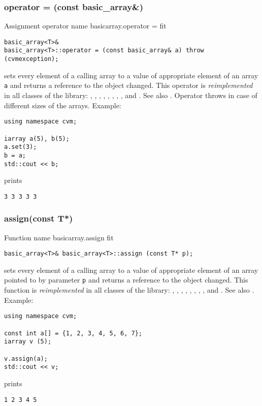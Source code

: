 \subsubsection{operator = (const basic\_array\&)}
Assignment operator%
\pdfdest name {basicarray.operator =} fit
\begin{verbatim}
basic_array<T>&
basic_array<T>::operator = (const basic_array& a) throw (cvmexception);
\end{verbatim}
sets every element of a calling array to a value of
appropriate element of an array  \verb"a"
and returns a reference to the object changed.
This operator is \emph{reimplemented} in all classes of the library:
,  ,
,   ,
, ,
, ,
 and .
See also .
Operator throws 
in case of different sizes of the arrays.
Example:
\begin{Verbatim}
using namespace cvm;

iarray a(5), b(5);
a.set(3);
b = a;
std::cout << b;
\end{Verbatim}
prints
\begin{Verbatim}
3 3 3 3 3
\end{Verbatim}
\newpage


\subsubsection{assign(const T*)}
Function%
\pdfdest name {basicarray.assign} fit
\begin{verbatim}
basic_array<T>& basic_array<T>::assign (const T* p);
\end{verbatim}
sets every element of a calling array to a value of
appropriate element of an array  pointed to by parameter \verb"p"
and returns a reference to the object changed.
This function is \emph{reimplemented} in all classes of the library:
,  ,
,   ,
, ,
, ,
 and .
See also .
Example:
\begin{Verbatim}
using namespace cvm;

const int a[] = {1, 2, 3, 4, 5, 6, 7};
iarray v (5);

v.assign(a);
std::cout << v;
\end{Verbatim}
prints
\begin{Verbatim}
1 2 3 4 5
\end{Verbatim}
\newpage


